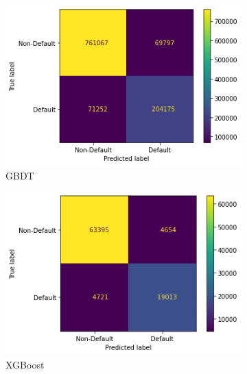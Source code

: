 \documentclass[twoside,11pt,a4paper]{article}
\begin{document}
\begin{figure}[h!]
	\begin{subfigure}{0.4 \textwidth}
		\includegraphics[width=1\linewidth, height=0.8\linewidth]{cm_gbdt}
		\caption[Gradient Boosting Decision Tree]{\acs{GBDT}}
		\label{fig:cm_gbdt}
	\end{subfigure}
	\hfill
	\begin{subfigure}{0.4 \textwidth}
		\includegraphics[width=1\linewidth, height=0.8\linewidth]{cm_xgboost}
		\caption[Xtreme Gradient Boosting Descision Tree]{\acs{XGBoost}}
		\label{fig:cm_xgboost}
	\end{subfigure}
	\begin{subfigure}{0.4 \textwidth}

\end{subfigure}
\end{figure}
\end{document}

